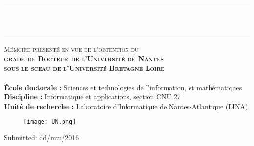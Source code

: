 \begin{titlepage}
\begin{center}
\vspace*{0.1cm}
\rule[9mm]{\textwidth}{2pt}\\
\noindent {\LARGE \textbf{\titre}}\\
\rule[-7mm]{\textwidth}{2pt}

\vspace*{2.3cm}
\noindent \large \textsc{Mémoire présenté en vue de l'obtention du \\{\bf grade de Docteur de l'Université de Nantes\\sous le sceau de l’Université Bretagne Loire}}\\
\vspace*{1.0cm}
\noindent \LARGE \ale{} \\\vspace*{3cm}
\noindent \large \textbf{École doctorale :} Sciences et technologies de l'information, et mathématiques\\
\textbf{Discipline :} Informatique et applications, section CNU 27\\
\textbf{Unité de recherche :} Laboratoire d'Informatique de Nantes-Atlantique (LINA)\\%
\vspace*{1cm}
\vfill
\vspace*{1cm}
\begin{figure}[!h]
\centering
\texttt{[image: UN.png]}
\caption*{}
\end{figure}

\vspace*{1.5cm}
\noindent \large {Submitted: dd/mm/2016}


\end{center}
\end{titlepage}
